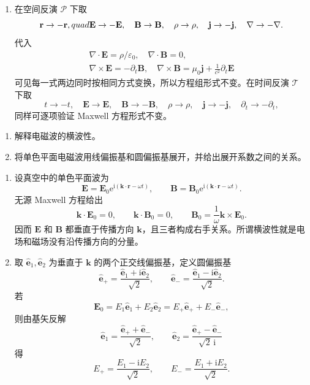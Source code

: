 \begin{question}
\begin{solution}
\begin{enumerate}
  \item 在空间反演 $\mathcal P$ 下取
  \[
    \mathbf r\to-\mathbf r,\\quad
    \mathbf E\to-\mathbf E,
    \quad \mathbf B\to\mathbf B,
    \quad \rho\to\rho,
    \quad \mathbf j\to-\mathbf j,
    \quad \nabla\to-\nabla .
  \]
  代入
  \[
  \begin{gathered}
    \nabla\cdot\mathbf E=\rho/\varepsilon_0,
    \quad \nabla\cdot\mathbf B=0,\\
    \nabla\times\mathbf E=-\partial_t\mathbf B,
    \quad \nabla\times\mathbf B=\mu_0\mathbf j+\frac{1}{c^2}\partial_t\mathbf E
  \end{gathered}
  \]
  可见每一式两边同时按相同方式变换，所以方程组形式不变。在时间反演 $\mathcal T$ 下取
  \[
    t\to-t,
    \quad \mathbf E\to\mathbf E,
    \quad \mathbf B\to-\mathbf B,
    \quad \rho\to\rho,
    \quad \mathbf j\to-\mathbf j,
    \quad \partial_t\to-\partial_t,
  \]
  同样可逐项验证 Maxwell 方程形式不变。
\end{enumerate}
\end{solution}
\end{question}

\begin{question}[电磁波的横波性与偏振基]
\begin{enumerate}
  \item 解释电磁波的横波性。
  \item 将单色平面电磁波用线偏振基和圆偏振基展开，并给出展开系数之间的关系。
\end{enumerate}
\begin{solution}
\begin{enumerate}
  \item 设真空中的单色平面波为
  \[
    \mathbf E=\mathbf E_0\mathrm e^{\mathrm i(\mathbf k\cdot\mathbf r-\omega t)},
    \qquad
    \mathbf B=\mathbf B_0\mathrm e^{\mathrm i(\mathbf k\cdot\mathbf r-\omega t)} .
  \]
  无源 Maxwell 方程给出
  \[
    \mathbf k\cdot\mathbf E_0=0,
    \qquad
    \mathbf k\cdot\mathbf B_0=0,
    \qquad
    \mathbf B_0=\frac{1}{\omega}\mathbf k\times\mathbf E_0 .
  \]
  因而 $\mathbf E$ 和 $\mathbf B$ 都垂直于传播方向 $\mathbf k$，且三者构成右手关系。所谓横波性就是电场和磁场没有沿传播方向的分量。

  \item 取 $\hat{\mathbf e}_1,\hat{\mathbf e}_2$ 为垂直于 $\mathbf k$ 的两个正交线偏振基，定义圆偏振基
  \[
    \hat{\mathbf e}_+=\frac{\hat{\mathbf e}_1+\mathrm i\hat{\mathbf e}_2}{\sqrt2},
    \qquad
    \hat{\mathbf e}_-=\frac{\hat{\mathbf e}_1-\mathrm i\hat{\mathbf e}_2}{\sqrt2} .
  \]
  若
  \[
    \mathbf E_0=E_1\hat{\mathbf e}_1+E_2\hat{\mathbf e}_2
    =E_+\hat{\mathbf e}_+ + E_-\hat{\mathbf e}_- ,
  \]
  则由基矢反解
  \[
    \hat{\mathbf e}_1=\frac{\hat{\mathbf e}_++\hat{\mathbf e}_-}{\sqrt2},
    \qquad
    \hat{\mathbf e}_2=\frac{\hat{\mathbf e}_+-\hat{\mathbf e}_-}{\sqrt2\,\mathrm i}
  \]
  得
  \[
    E_+=\frac{E_1-\mathrm iE_2}{\sqrt2},
    \qquad
    E_-=\frac{E_1+\mathrm iE_2}{\sqrt2} .
  \]
\end{enumerate}
\end{solution}
\end{question}

